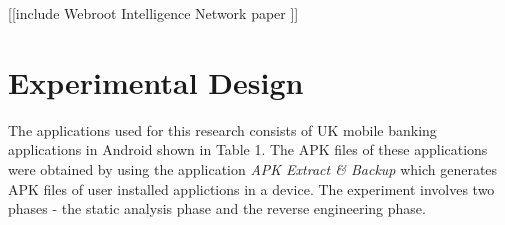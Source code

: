 \documentclass{mproj}
\begin{document}
[[include Webroot Intelligence Network paper \cite{webroot}]]



\chapter{Experimental Design}

The applications used for this research consists of UK mobile banking applications in Android shown in Table 1. The APK files of these applications were obtained by using the application \textit{APK Extract \& Backup} which generates APK files of user installed applictions in a device. The experiment involves two phases - the static analysis phase and the reverse engineering phase. 
\end{document}
